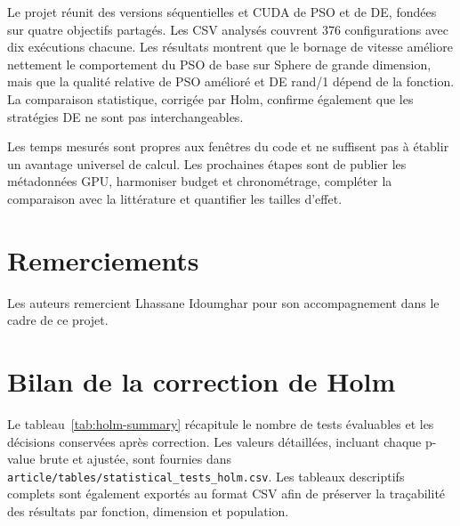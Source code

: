 \documentclass[conference]{IEEEtran}
\newcommand{\PSO}{\textsc{PSO}}
\newcommand{\DE}{\textsc{DE}}
\begin{document}
Le projet réunit des versions séquentielles et CUDA de \PSO{} et de \DE{},
fondées sur quatre objectifs partagés. Les CSV analysés couvrent 376
configurations avec dix exécutions chacune. Les résultats montrent que le
bornage de vitesse améliore nettement le comportement du PSO de base sur
Sphere de grande dimension, mais que la qualité relative de PSO amélioré et
DE rand/1 dépend de la fonction. La comparaison statistique, corrigée par
Holm, confirme également que les stratégies DE ne sont pas interchangeables.

Les temps mesurés sont propres aux fenêtres du code et ne suffisent pas à
établir un avantage universel de calcul. Les prochaines étapes sont de
publier les métadonnées GPU, harmoniser budget et chronométrage, compléter la
comparaison avec la littérature et quantifier les tailles d'effet.

\section*{Remerciements}
Les auteurs remercient Lhassane Idoumghar pour son accompagnement dans le
cadre de ce projet.




\appendices
\section{Bilan de la correction de Holm}
\label{app:holm}

Le tableau~\ref{tab:holm-summary} récapitule le nombre de tests évaluables et
les décisions conservées après correction. Les valeurs détaillées, incluant
chaque p-value brute et ajustée, sont fournies dans
\texttt{article/tables/statistical\_tests\_holm.csv}. Les tableaux
descriptifs complets sont également exportés au format CSV afin de préserver
la traçabilité des résultats par fonction, dimension et population.


\end{document}
